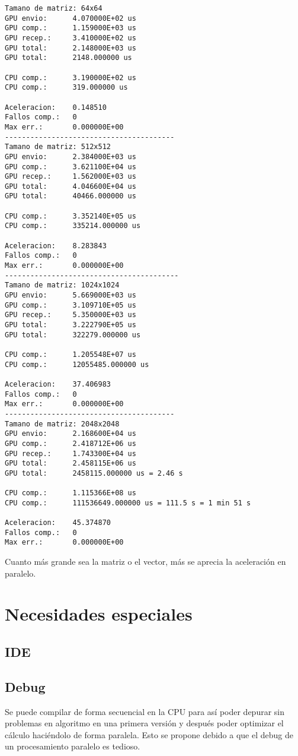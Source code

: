 \documentclass[12pt,a4paper]{article}
\begin{document}
\begin{lstlisting}
Tamano de matriz: 64x64
GPU envio:      4.070000E+02 us
GPU comp.:      1.159000E+03 us
GPU recep.:     3.410000E+02 us
GPU total:      2.148000E+03 us
GPU total:      2148.000000 us

CPU comp.:      3.190000E+02 us
CPU comp.:      319.000000 us

Aceleracion:    0.148510
Fallos comp.:   0
Max err.:       0.000000E+00
----------------------------------------
Tamano de matriz: 512x512
GPU envio:      2.384000E+03 us
GPU comp.:      3.621100E+04 us
GPU recep.:     1.562000E+03 us
GPU total:      4.046600E+04 us
GPU total:      40466.000000 us

CPU comp.:      3.352140E+05 us
CPU comp.:      335214.000000 us

Aceleracion:    8.283843
Fallos comp.:   0
Max err.:       0.000000E+00
-----------------------------------------
Tamano de matriz: 1024x1024
GPU envio:      5.669000E+03 us
GPU comp.:      3.109710E+05 us
GPU recep.:     5.350000E+03 us
GPU total:      3.222790E+05 us
GPU total:      322279.000000 us

CPU comp.:      1.205548E+07 us
CPU comp.:      12055485.000000 us

Aceleracion:    37.406983
Fallos comp.:   0
Max err.:       0.000000E+00
----------------------------------------
Tamano de matriz: 2048x2048
GPU envio:      2.168600E+04 us
GPU comp.:      2.418712E+06 us
GPU recep.:     1.743300E+04 us
GPU total:      2.458115E+06 us
GPU total:      2458115.000000 us = 2.46 s

CPU comp.:      1.115366E+08 us
CPU comp.:      111536649.000000 us = 111.5 s = 1 min 51 s

Aceleracion:    45.374870
Fallos comp.:   0
Max err.:       0.000000E+00
\end{lstlisting}

Cuanto más grande sea la matriz o el vector, más se aprecia la aceleración en
paralelo.
\section{Necesidades especiales}
\subsection{IDE}
\subsection{Debug}
Se puede compilar de forma secuencial en la CPU para así poder depurar sin
problemas en algoritmo en una primera versión y después poder optimizar el cálculo haciéndolo de forma paralela. Esto se propone debido a que el debug de un procesamiento paralelo es tedioso.
\end{document}
